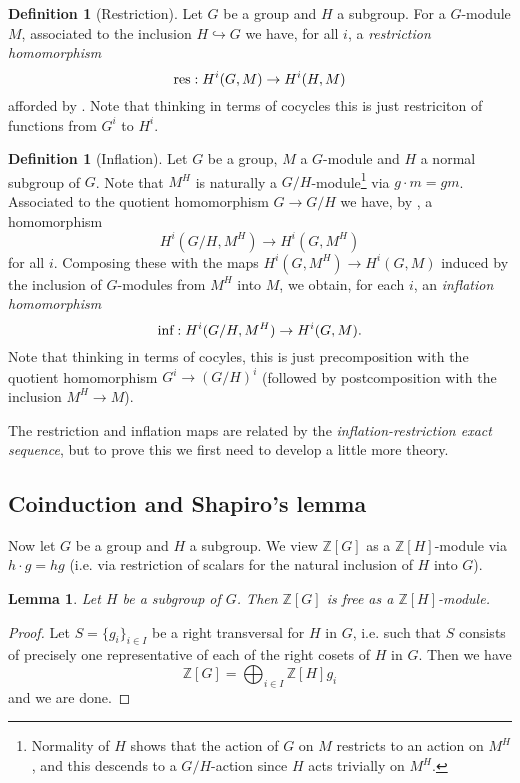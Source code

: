 \documentclass[11pt]{amsart}
\numberwithin{equation}{section}
\newtheorem{lemma}[equation]{Lemma}
\theoremstyle{remark}
\theoremstyle{remark}
\theoremstyle{remark}
\theoremstyle{definition}
\theoremstyle{definition}
\theoremstyle{definition}
\newtheorem{defi}[equation]{Definition}
\theoremstyle{definition}
\theoremstyle{definition}
\theoremstyle{definition}
\begin{document}
\begin{defi}[Restriction]
Let $G$ be a group and $H$ a subgroup. For a $G$-module $M$, associated to the inclusion $H\hookrightarrow G$ we have, for all $i$, a \textit{restriction homomorphism}
\[\textup{res}:H^i(G,M)\rightarrow H^i(H,M)\]
afforded by . Note that thinking in terms of cocycles this is just restriciton of functions from $G^i$ to $H^i$. 
\end{defi}

\begin{defi}[Inflation]
Let $G$ be a group, $M$ a $G$-module and $H$ a normal subgroup of $G$. Note that $M^H$ is naturally a $G/H$-module\footnote{Normality of $H$ shows that the action of $G$ on $M$ restricts to an action on $M^H$, and this descends to a $G/H$-action since $H$ acts trivially on $M^H$.} via $g\cdot m=gm$. Associated to the quotient homomorphism $G\rightarrow G/H$ we have, by , a homomorphism
\[H^i(G/H,M^H)\rightarrow H^i(G,M^H)\]
for all $i$. Composing these with the maps $H^i(G,M^H)\rightarrow H^i(G,M)$ induced by the inclusion of $G$-modules from $M^H$ into $M$, we obtain, for each $i$, an \textit{inflation homomorphism}
\[\textup{inf}:H^i(G/H,M^H)\rightarrow H^i(G,M).\]
Note that thinking in terms of cocyles, this is just precomposition with the quotient homomorphism $G^i\rightarrow (G/H)^i$ (followed by postcomposition with the inclusion $M^H\rightarrow M$).  
\end{defi}

The restriction and inflation maps are related by the \textit{inflation-restriction exact sequence}, but to prove this we first need to develop a little more theory. 

\subsection{Coinduction and Shapiro's lemma}

Now let $G$ be a group and $H$ a subgroup. We  view $\mathbb{Z}[G]$ as a $\mathbb{Z}[H]$-module via $h\cdot g=hg$ (i.e. via restriction of scalars for the natural inclusion of $H$ into $G$). 

\begin{lemma}
Let $H$ be a subgroup of $G$. Then $\mathbb{Z}[G]$ is free as a $\mathbb{Z}[H]$-module. 
\end{lemma}

\begin{proof}
Let $S=\{g_i\}_{i\in I}$ be a right transversal for $H$ in $G$, i.e. such that $S$ consists of precisely one representative of each of the right cosets of $H$ in $G$. Then we have
\[\mathbb{Z}[G]=\bigoplus_{i\in I}\mathbb{Z}[H]g_i\]
and we are done.
\end{proof}
\end{document}

